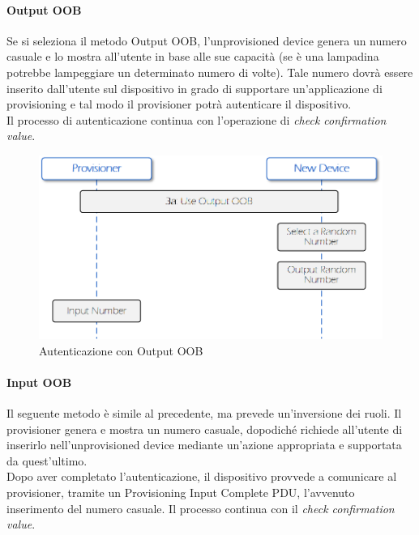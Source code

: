 \paragraph{Output OOB}
Se si seleziona il metodo Output OOB, l'unprovisioned device genera un numero casuale e lo mostra all'utente in base alle sue capacità (se è una lampadina potrebbe lampeggiare un determinato numero di volte). Tale numero dovrà essere inserito dall'utente sul dispositivo in grado di supportare un'applicazione di provisioning e tal modo il provisioner potrà autenticare il dispositivo. \\
Il processo di autenticazione continua con l'operazione di \textit{check confirmation value}.

\begin{figure}[!ht]
    \centering
    \includegraphics[width = \textwidth]{images/Provisioning_OOB_output.png}
    \caption{Autenticazione con Output OOB}
    \label{fig:provisioning_output_OOB}
\end{figure}

\paragraph{Input OOB}
Il seguente metodo è simile al precedente, ma prevede un'inversione dei ruoli. Il provisioner genera e mostra un numero casuale, dopodiché richiede all'utente di inserirlo nell'unprovisioned device mediante un'azione appropriata e supportata da quest'ultimo.\\
Dopo aver completato l'autenticazione, il dispositivo provvede a comunicare al provisioner, tramite un Provisioning Input Complete PDU, l'avvenuto inserimento del numero casuale. Il processo continua con il \textit{check confirmation value}.

